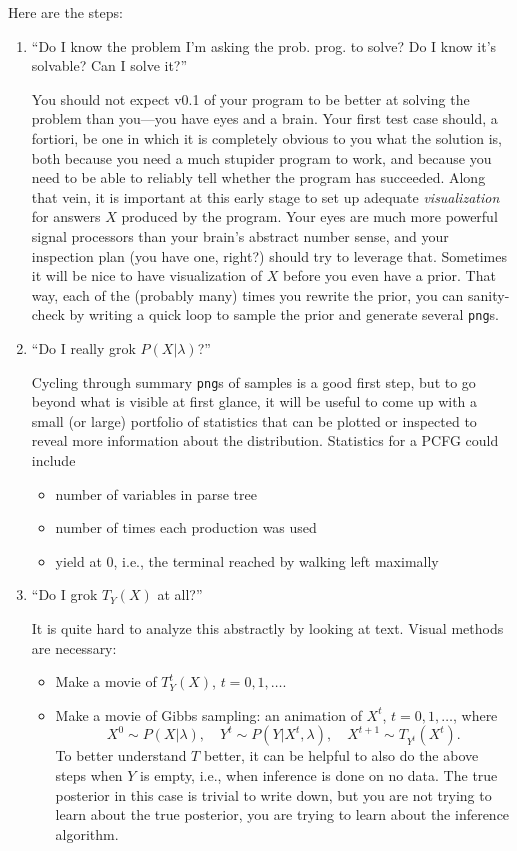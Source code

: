 \documentclass[11pt]{article}
\begin{document}
Here are the steps:
\begin{enumerate}
  \item ``Do I know the problem I'm asking the prob. prog. to solve?  Do I know
    it's solvable?  Can I solve it?''

    You should not expect v0.1 of your program to be better at solving the
    problem than you---you have eyes and a brain.  Your first test case should,
    a fortiori, be one in which it is completely obvious to you what the
    solution is, both because you need a much stupider program to work, and
    because you need to be able to reliably tell whether the program has
    succeeded.  Along that vein, it is important at this early stage to set up
    adequate {\em visualization} for answers $X$ produced by the program.  Your
    eyes are much more powerful signal processors than your brain's abstract
    number sense, and your inspection plan (you have one, right?) should try to
    leverage that.  Sometimes it will be nice to have visualization of $X$
    before you even have a prior.  That way, each of the (probably many) times
    you rewrite the prior, you can sanity-check by writing a quick loop to
    sample the prior and generate several \texttt{png}s.

  \item ``Do I really grok $P(X|\lambda)$?''

    Cycling through summary \texttt{png}s of samples is a good first step, but
    to go beyond what is visible at first glance, it will be useful to come up
    with a small (or large) portfolio of statistics that can be plotted or
    inspected to reveal more information about the distribution.  Statistics for
    a PCFG could include
    \begin{itemize}[noitemsep]
      \item number of variables in parse tree
      \item number of times each production was used
      \item yield at 0, i.e., the terminal reached by walking left maximally
    \end{itemize}

  \item\label{itm:grok-transition-operator}
    ``Do I grok $T_Y(X)$ at all?''

    It is quite hard to analyze this abstractly by looking at text.  Visual
    methods are necessary:
    \begin{itemize}[noitemsep]
      \item Make a movie of $T_Y^t(X)$, $t=0,1,\ldots$.
      \item Make a movie of Gibbs sampling: an animation of $X^t$, $t=0,1,\ldots$, where
        \[
        X^0 \sim P(X|\lambda), \quad
        Y^t \sim P(Y|X^t,\lambda), \quad
        X^{t+1} \sim T_{Y^t}(X^t).
        \]
        To better understand $T$ better, it can be helpful to also do the above
        steps when $Y$ is empty, i.e., when inference is done on no data.  The
        true posterior in this case is trivial to write down, but you are not
        trying to learn about the true posterior, you are trying to learn about
        the inference algorithm.
    \end{itemize}


\end{enumerate}
\end{document}
